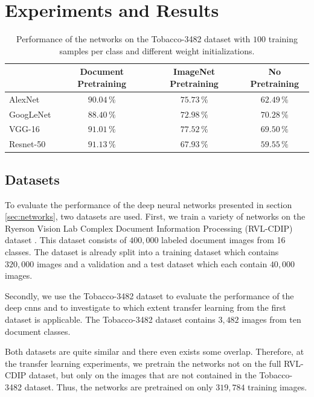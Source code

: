 \section{Experiments and Results}

\begin{table}
\renewcommand{\arraystretch}{1.3}
\centering
\caption{Performance of the networks on the Tobacco-3482 dataset with $100$ training samples per class and different weight initializations.}
\begin{tabular}{l|c|c|c}
 & Document Pretraining & ImageNet Pretraining & No Pretraining \\\hline
AlexNet & $90.04\,\%$ & $75.73\,\%$ & $62.49\,\%$ \\\hline
GoogLeNet & $88.40\,\%$ & $72.98\,\%$ & $70.28\,\%$ \\\hline
VGG-16 & $91.01\,\%$ & $77.52\,\%$ & $69.50\,\%$ \\\hline
Resnet-50 & $91.13\,\%$ & $67.93\,\%$ & $59.55\,\%$
\end{tabular}
\label{tab:accuracy_small}
\end{table}



\subsection{Datasets}
To evaluate the performance of the deep neural networks presented in section \ref{sec:networks}, two datasets are used. First, we train a variety of networks on the Ryerson Vision Lab Complex Document Information Processing (RVL-CDIP) dataset \cite{harley2015evaluation}. This dataset consists of $400,000$ labeled document images from 16 classes. The dataset is already split into a training dataset which contains $320,000$ images and a validation and a test dataset which each contain $40,000$ images.

Secondly, we use the Tobacco-3482 dataset \cite{doclass_Kumar14} to evaluate the performance of the deep \ac{cnn}s and to investigate to which extent transfer learning from the first dataset is applicable. The Tobacco-3482 dataset contains $3,482$ images from ten document classes. 

Both datasets are quite similar and there even exists some overlap. Therefore, at the transfer learning experiments, we pretrain the networks not on the full RVL-CDIP dataset, but only on the images that are not contained in the Tobacco-3482 dataset. Thus, the networks are pretrained on only $319,784$ training images.




